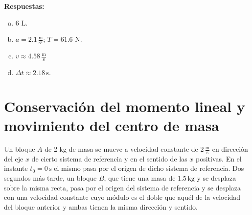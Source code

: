 \documentclass[addpoints]{exam}
\newcommand{\rtas}{\textbf{Respuestas: }}
\begin{document}
\begin{questions}
\begin{figure}[h]
        \caption{}
        \label{fig:ej18}
    \end{figure}

    \pagebreak
    \rtas
    \begin{enumerate}[a)]
        \item 6 L.
        \item $a = 2.1 \, \frac{\text{m}}{\text{s}^2}$; $T = 61.6$ N.
        \item $v \approx 4.58 \, \frac{\text{m}}{\text{s}}$
        \item $\Delta t \approx 2.18 \, \text{s}$.
    \end{enumerate}

    \section{Conservación del momento lineal y movimiento del centro de masa}

    \question Un bloque $A$ de 2 kg de masa se mueve a velocidad constante de $2 \, \frac{\text{m}}{\text{s}}$ en dirección del eje $x$ de cierto sistema de referencia y en el sentido de las $x$ positivas. En el instante $t_0 = 0 \, \text{s}$ el mismo pasa por el origen de dicho sistema de referencia. Dos segundos más tarde, un bloque $B$, que tiene una masa de $1.5 \, \text{kg}$ y se desplaza sobre la misma recta, pasa por el origen del sistema de referencia y se desplaza con una velocidad constante cuyo módulo es el doble que aquél de la velocidad del bloque anterior y ambas tienen la misma dirección y sentido.
\end{questions}
\end{document}
